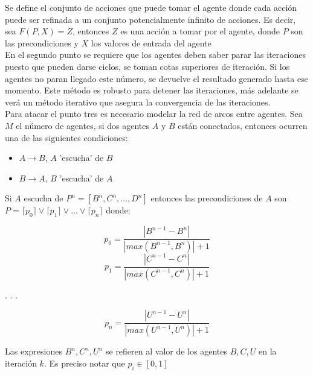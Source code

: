         Se define el conjunto de acciones que puede tomar el agente donde cada acción puede ser refinada a un conjunto potencialmente infinito de acciones. Es decir, sea $F(P,X)=Z$, entonces $Z$ es una acción a tomar por el agente, donde $P$ son las precondiciones y $X$ los valores de entrada del agente \\

        En el segundo punto se requiere que los agentes deben saber parar las iteraciones puesto que pueden darse ciclos, se toman cotas superiores de iteración. Si los agentes no paran llegado este número, se devuelve el resultado generado hasta ese momento. Este método es robusto para detener las iteraciones, más adelante se verá un método iterativo que asegura la convergencia de las iteraciones. \\

        Para atacar el punto tres es necesario modelar la red de arcos entre agentes. Sea $M$ el número de agentes, si dos agentes $A$ y $B$ están conectados, entonces ocurren una de las siguientes condiciones:

        \begin{itemize}
            \item $A\rightarrow B$, $A$ 'escucha' de $B$
            \item  $B \rightarrow A$, $B$ 'escucha' de $A$
        \end{itemize}

        Si $A$ escucha de $P^n=[B^n,C^n,...,D^n]$ entonces las precondiciones de $A$ son $P=\lceil p_0 \rceil \lor \lceil p_1 \rceil \lor...\lor \lceil p_n \rceil$ donde:

        \begin{equation*}
            p_0=  \frac{|B^{n-1}-B^n|}{|max(B^{n-1},B^n)|+1}
        \end{equation*}
        \begin{equation*}
            p_1= \frac{|C^{n-1}-C^n|}{|max(C^{n-1},C^n)|+1}
        \end{equation*}
        \begin{center}
            .
            .
            .
        \end{center}

        \begin{equation*}
            p_n=  \frac{|U^{n-1}-U^n|}{|max(U^{n-1},U^n)|+1}
        \end{equation*}

        Las expresiones $B^n,C^n,U^n$ se refieren al valor de los agentes $B,C,U$ en la iteración $k$. Es preciso notar que $p_i \in [0,1]$ \\

